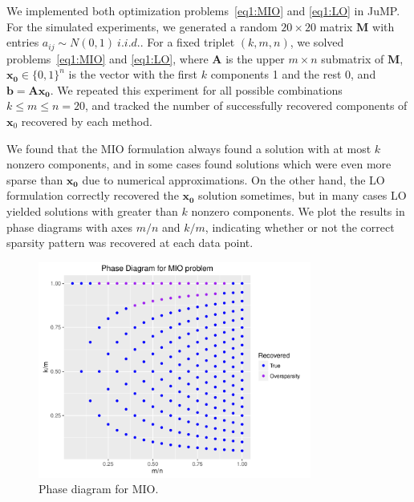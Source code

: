 \documentclass[12pt]{article}
\newcommand{\M}{\mathbf}
\newcommand{\1}{\mathds{1}}
\begin{document}
We implemented both optimization problems~\ref{eq1:MIO} and \ref{eq1:LO} in JuMP.  For the simulated experiments, we generated a random $20 \times 20$ matrix $\M M$ with entries $a_{ij} \sim N(0,1)~i.i.d.$.  For a fixed triplet $(k, m, n)$, we solved problems~\ref{eq1:MIO} and \ref{eq1:LO}, where $\M A$ is the upper $m \times n$ submatrix of $\M M$, $\M{x_0} \in \{0,1\}^n$ is the vector with the first $k$ components 1 and the rest 0, and $\M{b = Ax_0}$.   We repeated this experiment for all possible combinations $k \le m \le n = 20$, and tracked the number of successfully recovered components of $\M x_0$ recovered by each method.  

We found that the MIO formulation always found a solution with at most $k$ nonzero components, and in some cases found solutions which were even more sparse than $\M{x_0}$ due to numerical approximations.  On the other hand, the LO formulation correctly recovered the $\M{x_0}$ solution sometimes, but in many cases LO yielded solutions with greater than $k$ nonzero components.  We plot the results in phase diagrams with axes $m/n$ and $k/m$, indicating whether or not the correct sparsity pattern was recovered at each data point.  

\begin{figure}[tb]
  \centering
  \includegraphics[width=0.8\textwidth]{phase_MIO}
  \caption{Phase diagram for MIO.}\label{fig:MIO_phase}
\end{figure}
\end{document}
